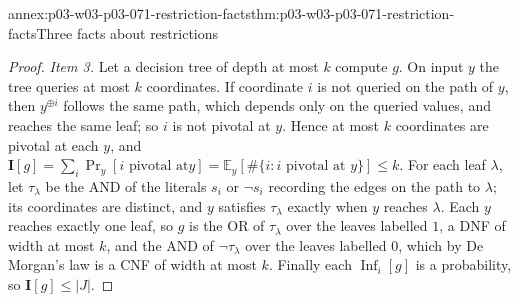\begin{annexitem}{annex:p03-w03-p03-071-restriction-facts}{thm:p03-w03-p03-071-restriction-facts}{Three facts about restrictions}
\begin{proof}
\emph{Item 3.}  Let a decision tree of depth at most \(k\) compute \(g\).  On
input \(y\) the tree queries at most \(k\) coordinates.  If coordinate \(i\)
is not queried on the path of \(y\), then \(y^{\oplus i}\) follows the same
path, which depends only on the queried values, and reaches the same leaf;
so \(i\) is not pivotal at \(y\).  Hence at most \(k\) coordinates are
pivotal at each \(y\), and \(\mathbf I[g]=\sum_i\Pr_y[i\text{ pivotal at
}y]=\mathbb E_y[\#\{i:i\text{ pivotal at }y\}]\leq k\).  For each leaf
\(\lambda\), let \(\tau_\lambda\) be the AND of the literals \(s_i\) or
\(\neg s_i\) recording the edges on the path to \(\lambda\); its coordinates
are distinct, and \(y\) satisfies \(\tau_\lambda\) exactly when \(y\)
reaches \(\lambda\).  Each \(y\) reaches exactly one leaf, so \(g\) is the OR
of \(\tau_\lambda\) over the leaves labelled \(1\), a DNF of width at most
\(k\), and the AND of \(\neg\tau_\lambda\) over the leaves labelled \(0\),
which by De Morgan's law is a CNF of width at most \(k\).  Finally each
\(\operatorname{Inf}_i[g]\) is a probability, so \(\mathbf I[g]\leq|J|\).
\end{proof}
\end{annexitem}

